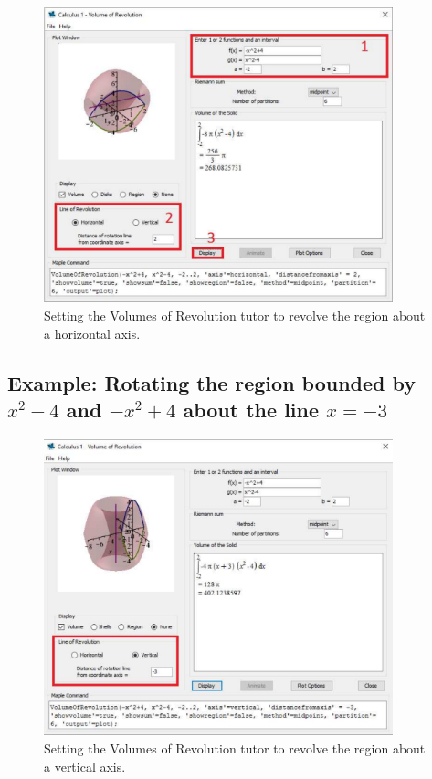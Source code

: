 \begin{figure}
\caption{Setting the Volumes of Revolution tutor to revolve the region about a horizontal axis.}
\centering
\includegraphics[width=0.9\textwidth]{tutorials/figures/VoRTutorQ1-1-eps-converted-to.pdf}
\end{figure}

\clearpage

\subsection*{Example: Rotating the region bounded by $x^2-4$ and $-x^2+4$ about the line $x=-3$}

\begin{figure}
\caption{Setting the Volumes of Revolution tutor to revolve the region about a vertical axis.}
\centering
\includegraphics[width=0.9\textwidth]{tutorials/figures/VoRTutorQ1-2-eps-converted-to.pdf}
\end{figure}

